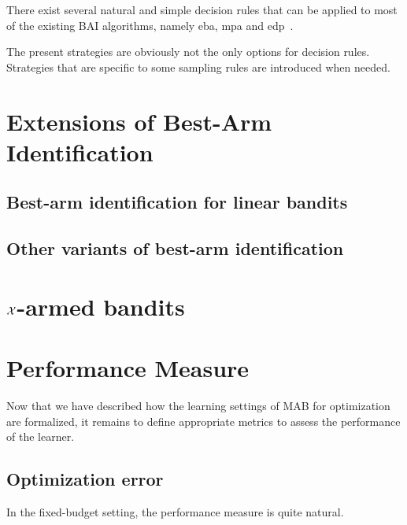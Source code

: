 There exist several natural and simple decision rules that can be applied to most of the existing BAI algorithms, namely \gls{eba}, \gls{mpa} and \gls{edp}~\citep{bubeck2009pure}.

\begin{remark}
\begin{leftbar}[remarkbar]
    The present strategies are obviously not the only options for decision rules. Strategies that are specific to some sampling rules are introduced when needed.
\end{leftbar}
\end{remark}

\section{Extensions of Best-Arm Identification}\label{sec:mab.extensions}

\subsection{Best-arm identification for linear bandits}\label{sec:mab.extensions.linear}

\subsection{Other variants of best-arm identification}\label{sec:mab.extensions.other}

\section{$\mathcal{X}$-armed bandits}\label{sec:mab.continuum}

\section{Performance Measure}\label{sec:mab.performance}

Now that we have described how the learning settings of MAB for optimization are formalized, it remains to define appropriate metrics to assess the performance of the learner.

\subsection{Optimization error}\label{sec:mab.performance.optim}

In the fixed-budget setting, the performance measure is quite natural.

